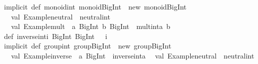 \begin{isabellebody}
\begin{isamarkuptext}
{}\isanewline
\isanewline
implicit\ def\ monoid{}int{}\ monoid{}BigInt{}\ {}\ new\ monoid{}BigInt{}\ {}\isanewline
\ \ val\ {}Example{}neutral{}\ {}\ neutral{}int\isanewline
\ \ val\ {}Example{}mult{}\ {}\ {}a{}\ BigInt{}\ b{}\ BigInt{}\ {}{}\ mult{}int{}a{}\ b{}\isanewline
{}\isanewline
\isanewline
def\ inverse{}int{}i{}\ BigInt{}{}\ BigInt\ {}\ {}{}\ i{}\isanewline
\isanewline
implicit\ def\ group{}int{}\ group{}BigInt{}\ {}\ new\ group{}BigInt{}\ {}\isanewline
\ \ val\ {}Example{}inverse{}\ {}\ {}a{}\ BigInt{}\ {}{}\ inverse{}int{}a{}\isanewline
\ \ val\ {}Example{}neutral{}\ {}\ neutral{}int\isanewline

\end{isamarkuptext}
\end{isabellebody}
